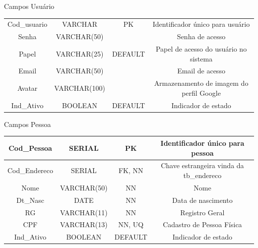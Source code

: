 \begin{quadro}[H]
	\caption{Campos Usuário}
	\centering
	\begin{tabular}{| c | c | c | c |}
		\hline
		\thead{Campo} & \thead{Tipo} & \thead{Restrição}	& \thead{Descrição}\\
		\hline
		Cod\_usuario & VARCHAR      & PK      & Identificador único para usuário         \\ \hline
		Senha        & VARCHAR(50)  &         & Senha de acesso                          \\ \hline
		Papel        & VARCHAR(25)  & DEFAULT & Papel de acesso do usuário no sistema    \\ \hline
		Email        & VARCHAR(50)  &         & Email de acesso                          \\ \hline
		Avatar       & VARCHAR(100) &         & Armazenamento de imagem do perfil Google \\ \hline
		Ind\_Ativo   & BOOLEAN      & DEFAULT & Indicador de estado                      \\ \hline
	\end{tabular}
	\label{Campos Usuário}
\end{quadro}



\begin{quadro}[H]
	\caption{Campos Pessoa}
	\centering
	\begin{tabular}{| c | c | c | c |}
		\hline
		Cod\_Pessoa   & SERIAL      & PK      & Identificador único para pessoa         \\ \hline
		Cod\_Endereco & SERIAL      & FK, NN  & Chave estrangeira vinda da tb\_endereco \\ \hline
		Nome          & VARCHAR(50) & NN      & Nome                                    \\ \hline
		Dt\_Nasc      & DATE        & NN      & Data de nascimento                      \\ \hline
		RG            & VARCHAR(11) & NN      & Registro Geral                          \\ \hline
		CPF           & VARCHAR(13) & NN, UQ  & Cadastro de Pessoa Física               \\ \hline
		Ind\_Ativo    & BOOLEAN     & DEFAULT & Indicador de estado                     \\ \hline
	\end{tabular}
	\label{Campos Usuário}
\end{quadro}

